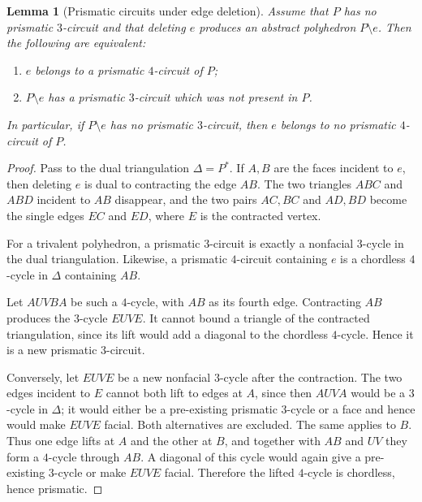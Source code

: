 \documentclass[12pt,a4paper]{article}
\newtheorem{lemma}[theorem]{Lemma}
\theoremstyle{definition}
\begin{document}
\begin{lemma}[Prismatic circuits under edge deletion]\label{lem:circuit-correspondence}
Assume that \(P\) has no prismatic \(3\)-circuit and that deleting \(e\)
produces an abstract polyhedron \(P\setminus e\). Then the following are
equivalent:
\begin{enumerate}[label=\textup{(\alph*)}]
\item \(e\) belongs to a prismatic \(4\)-circuit of \(P\);
\item \(P\setminus e\) has a prismatic \(3\)-circuit which was not present in
\(P\).
\end{enumerate}
In particular, if \(P\setminus e\) has no prismatic \(3\)-circuit, then \(e\)
belongs to no prismatic \(4\)-circuit of \(P\).
\end{lemma}

\begin{proof}
Pass to the dual triangulation \(\Delta=P^*\).  If \(A,B\) are the faces
incident to \(e\), then deleting \(e\) is dual to contracting the edge
\(AB\).  The two triangles \(ABC\) and \(ABD\) incident to \(AB\) disappear,
and the two pairs \(AC,BC\) and \(AD,BD\) become the single edges \(EC\) and
\(ED\), where \(E\) is the contracted vertex.

For a trivalent polyhedron, a prismatic \(3\)-circuit is exactly a
nonfacial \(3\)-cycle in the dual triangulation.  Likewise, a prismatic
\(4\)-circuit containing \(e\) is a chordless \(4\)-cycle in \(\Delta\)
containing \(AB\).

Let \(AUVBA\) be such a \(4\)-cycle, with \(AB\) as its fourth edge.
Contracting \(AB\) produces the \(3\)-cycle \(EUV E\).  It cannot bound a
triangle of the contracted triangulation, since its lift would add a
diagonal to the chordless \(4\)-cycle.  Hence it is a new prismatic
\(3\)-circuit.

Conversely, let \(EUV E\) be a new nonfacial \(3\)-cycle after the
contraction.  The two edges incident to \(E\) cannot both lift to edges at
\(A\), since then \(AUV A\) would be a \(3\)-cycle in \(\Delta\); it would
either be a pre-existing prismatic \(3\)-cycle or a face and hence would make
\(EUV E\) facial.  Both alternatives are excluded.  The same applies to
\(B\).  Thus one edge lifts at \(A\) and the other at \(B\), and together
with \(AB\) and \(UV\) they form a \(4\)-cycle through \(AB\).  A diagonal of
this cycle would again give a pre-existing \(3\)-cycle or make \(EUV E\)
facial.  Therefore the lifted \(4\)-cycle is chordless, hence prismatic.
\end{proof}
\end{document}
